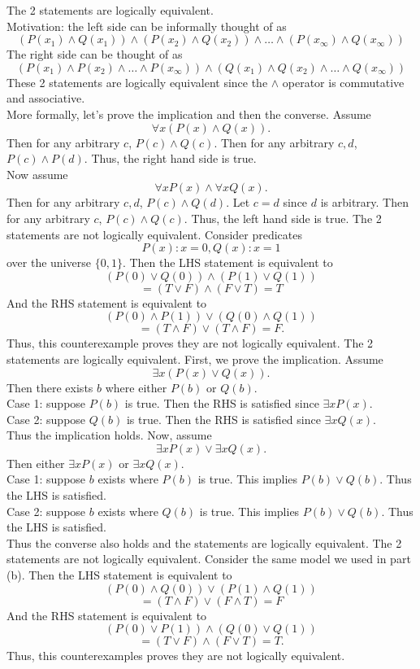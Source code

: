 \documentclass[11pt]{article}
\begin{document}
\begin{solution}
  \begin{Parts}
  \Part The 2 statements are logically equivalent.
  \\Motivation: the left side can be informally thought of as 
  $$(P(x_1)\land Q(x_1))\land(P(x_2)\land Q(x_2))\land\dots\land(P(x_\infty)\land Q(x_\infty))$$
  The right side can be thought of as
  $$(P(x_1)\land P(x_2)\land\dots\land P(x_\infty))
  \land(Q(x_1)\land Q(x_2)\land\dots\land Q(x_\infty))$$
  These 2 statements are logically equivalent since the $\land$ operator is commutative and associative.
  \\More formally, let's prove the implication and then the converse.
  Assume 
  $$\forall x(P(x)\land Q(x)).$$
  Then for any arbitrary $c$, $P(c)\land Q(c)$. 
  Then for any arbitrary $c,d$, $P(c)\land P(d)$.
  Thus, the right hand side is true.
  \\Now assume 
  $$\forall xP(x)\land\forall xQ(x).$$
  Then for any arbitrary $c,d$, $P(c)\land Q(d)$.
  Let $c=d$ since $d$ is arbitrary.
  Then for any arbitrary $c$, $P(c)\land Q(c)$.
  Thus, the left hand side is true.
  \Part The 2 statements are not logically equivalent.
  Consider predicates 
  $$P(x): x = 0, Q(x): x = 1$$
  over the universe $\{0,1\}$.
  Then the LHS statement is equivalent to 
  $$(P(0)\lor Q(0))\land (P(1)\lor Q(1))$$
  $$=(T\lor F)\land(F\lor T)=T$$
  And the RHS statement is equivalent to
  $$(P(0)\land P(1))\lor (Q(0)\land Q(1))$$
  $$=(T\land F)\lor(T\land F)=F.$$ 
  Thus, this counterexample proves they are not logically equivalent.
  \Part The 2 statements are logically equivalent.
  First, we prove the implication. Assume
  $$\exists x(P(x)\lor Q(x)).$$
  Then there exists $b$ where either $P(b)$ or $Q(b)$.
  \\Case 1: suppose $P(b)$ is true. Then the RHS is satisfied since $\exists xP(x)$.
  \\Case 2: suppose $Q(b)$ is true. Then the RHS is satisfied since $\exists xQ(x)$. 
  \\Thus the implication holds.
  Now, assume
  $$\exists xP(x)\lor\exists xQ(x).$$
  Then either $\exists xP(x)$ or $\exists xQ(x)$.
  \\Case 1: suppose $b$ exists where $P(b)$ is true.
  This implies $P(b)\lor Q(b)$. Thus the LHS is satisfied.
  \\Case 2: suppose $b$ exists where $Q(b)$ is true.
  This implies $P(b)\lor Q(b)$. Thus the LHS is satisfied.
  \\Thus the converse also holds and the statements are logically equivalent.
  \Part The 2 statements are not logically equivalent. Consider the same model we used in part (b).
  Then the LHS statement is equivalent to
  $$(P(0)\land Q(0))\lor(P(1)\land Q(1))$$
  $$=(T\land F)\lor(F\land T)=F$$
  And the RHS statement is equivalent to
  $$(P(0)\lor P(1))\land(Q(0)\lor Q(1))$$
  $$=(T\lor F)\land(F\lor T)=T.$$
  Thus, this counterexamples proves they are not logically equivalent.
\end{Parts}
\end{solution}
\end{document}
